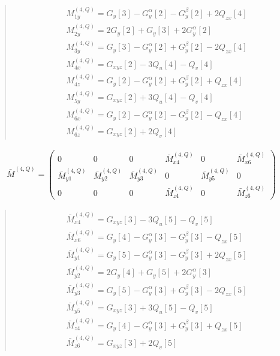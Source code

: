 \documentclass[fleqn,10pt]{jsarticle}
\begin{document}
\begin{quote}
\begin{align*}
& M^{(4,Q)}_{1y} = G_{y}[3] - G_{y}^{\alpha}[2] - G_{y}^{\beta}[2] + 2 Q_{zx}[4] \\
& M^{(4,Q)}_{2y} = 2 G_{y}[2] + G_{y}[3] + 2 G_{y}^{\alpha}[2] \\
& M^{(4,Q)}_{3y} = G_{y}[3] - G_{y}^{\alpha}[2] + G_{y}^{\beta}[2] - 2 Q_{zx}[4] \\
& M^{(4,Q)}_{4x} = G_{xyz}[2] - 3 Q_{u}[4] - Q_{v}[4] \\
& M^{(4,Q)}_{4z} = G_{y}[2] - G_{y}^{\alpha}[2] + G_{y}^{\beta}[2] + Q_{zx}[4] \\
& M^{(4,Q)}_{5y} = G_{xyz}[2] + 3 Q_{u}[4] - Q_{v}[4] \\
& M^{(4,Q)}_{6x} = G_{y}[2] - G_{y}^{\alpha}[2] - G_{y}^{\beta}[2] - Q_{zx}[4] \\
& M^{(4,Q)}_{6z} = G_{xyz}[2] + 2 Q_{v}[4]
\end{align*}
\end{quote}
\begin{align*}
\bar{M}^{(4,Q)} = \begin{pmatrix} 0 & 0 & 0 & \bar{M}^{(4,Q)}_{x4} & 0 & \bar{M}^{(4,Q)}_{x6} \\ \bar{M}^{(4,Q)}_{y1} & \bar{M}^{(4,Q)}_{y2} & \bar{M}^{(4,Q)}_{y3} & 0 & \bar{M}^{(4,Q)}_{y5} & 0 \\ 0 & 0 & 0 & \bar{M}^{(4,Q)}_{z4} & 0 & \bar{M}^{(4,Q)}_{z6} \end{pmatrix}
\end{align*}
\begin{quote}
\begin{align*}
& \bar{M}^{(4,Q)}_{x4} = G_{xyz}[3] - 3 Q_{u}[5] - Q_{v}[5] \\
& \bar{M}^{(4,Q)}_{x6} = G_{y}[4] - G_{y}^{\alpha}[3] - G_{y}^{\beta}[3] - Q_{zx}[5] \\
& \bar{M}^{(4,Q)}_{y1} = G_{y}[5] - G_{y}^{\alpha}[3] - G_{y}^{\beta}[3] + 2 Q_{zx}[5] \\
& \bar{M}^{(4,Q)}_{y2} = 2 G_{y}[4] + G_{y}[5] + 2 G_{y}^{\alpha}[3] \\
& \bar{M}^{(4,Q)}_{y3} = G_{y}[5] - G_{y}^{\alpha}[3] + G_{y}^{\beta}[3] - 2 Q_{zx}[5] \\
& \bar{M}^{(4,Q)}_{y5} = G_{xyz}[3] + 3 Q_{u}[5] - Q_{v}[5] \\
& \bar{M}^{(4,Q)}_{z4} = G_{y}[4] - G_{y}^{\alpha}[3] + G_{y}^{\beta}[3] + Q_{zx}[5] \\
& \bar{M}^{(4,Q)}_{z6} = G_{xyz}[3] + 2 Q_{v}[5]
\end{align*}
\end{quote}
\end{document}
